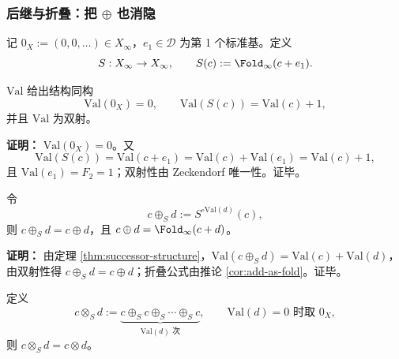 \subsubsection{后继与折叠：把 \texorpdfstring{$\oplus$}{oplus} 也消隐}\label{subsec:succ-and-fold}
\begin{definition}[后继与折叠]\label{def:successor-fold}
记 $0_X:=(0,0,\dots)\in X_\infty$，$e_1\in\mathcal{D}$ 为第 1 个标准基。定义
\[
S:X_\infty\to X_\infty,\qquad S(c):=\Fold_\infty(c+e_1).
\]
\end{definition}

\begin{theorem}[后继结构同构]\label{thm:successor-structure}
$\mathrm{Val}$ 给出结构同构
\[
\mathrm{Val}(0_X)=0,\qquad \mathrm{Val}(S(c))=\mathrm{Val}(c)+1,
\]
并且 $\mathrm{Val}$ 为双射。
\end{theorem}

\textbf{证明：}
$\mathrm{Val}(0_X)=0$。又
\[
\mathrm{Val}(S(c))=\mathrm{Val}(c+e_1)=\mathrm{Val}(c)+\mathrm{Val}(e_1)=\mathrm{Val}(c)+1,
\]
且 $\mathrm{Val}(e_1)=F_2=1$；双射性由 Zeckendorf 唯一性。证毕。

\begin{corollary}[加法由后继迭代给出]\label{cor:add-from-successor}
令
\[
c\oplus_S d:=S^{\circ\mathrm{Val}(d)}(c),
\]
则 $c\oplus_S d=c\oplus d$，且 $c\oplus d=\Fold_\infty(c+d)$。
\end{corollary}

\textbf{证明：}
由定理 \ref{thm:successor-structure}，$\mathrm{Val}(c\oplus_S d)=\mathrm{Val}(c)+\mathrm{Val}(d)$，由双射性得 $c\oplus_S d=c\oplus d$；折叠公式由推论 \ref{cor:add-as-fold}。证毕。

\begin{theorem}[乘法由后继迭代内生]\label{thm:mul-from-successor}
定义
\[
c\otimes_S d:=\underbrace{c\oplus_S c\oplus_S\cdots\oplus_S c}_{\mathrm{Val}(d)\text{ 次}},
\qquad \mathrm{Val}(d)=0\text{ 时取 }0_X,
\]
则 $c\otimes_S d=c\otimes d$。
\end{theorem}

